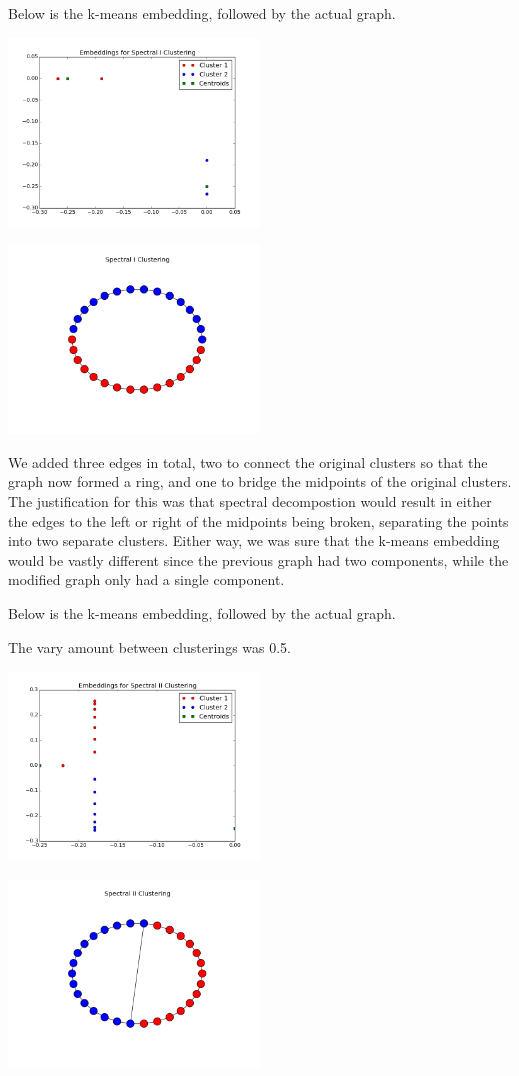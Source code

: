 \documentclass[12pt]{article}
\begin{document}
\begin{enumerate}
Below is the k-means embedding, followed by the actual graph.

\includegraphics[width=0.5\textwidth]{Embeddings_for_Spectral_I_Clustering.png}

\includegraphics[width=0.5\textwidth]{Spectral_I_Clustering.png}

We added three edges in total, two to connect the original clusters so that the graph now formed a ring, and one to bridge the midpoints of the original clusters. The justification for this was that spectral decompostion would result in either the edges to the left or right of the midpoints being broken, separating the points into two separate clusters. Either way, we was sure that the k-means embedding would be vastly different since the previous graph had two components, while the modified graph only had a single component.

Below is the k-means embedding, followed by the actual graph.

The vary amount between clusterings was 0.5.

\includegraphics[width=0.5\textwidth]{Embeddings_for_Spectral_II_Clustering.png}

\includegraphics[width=0.5\textwidth]{Spectral_II_Clustering.png}

\end{enumerate}
\end{document}
